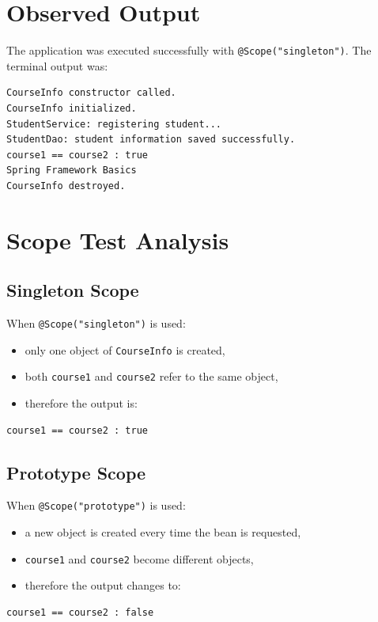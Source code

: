 \documentclass[12pt,a4paper]{article}
\begin{document}
\section{Observed Output}
The application was executed successfully with \texttt{@Scope("singleton")}. The terminal output was:

\begin{lstlisting}
CourseInfo constructor called.
CourseInfo initialized.
StudentService: registering student...
StudentDao: student information saved successfully.
course1 == course2 : true
Spring Framework Basics
CourseInfo destroyed.
\end{lstlisting}

\section{Scope Test Analysis}
\subsection{Singleton Scope}
When \texttt{@Scope("singleton")} is used:
\begin{itemize}
    \item only one object of \texttt{CourseInfo} is created,
    \item both \texttt{course1} and \texttt{course2} refer to the same object,
    \item therefore the output is:
\end{itemize}

\begin{lstlisting}
course1 == course2 : true
\end{lstlisting}

\subsection{Prototype Scope}
When \texttt{@Scope("prototype")} is used:
\begin{itemize}
    \item a new object is created every time the bean is requested,
    \item \texttt{course1} and \texttt{course2} become different objects,
    \item therefore the output changes to:
\end{itemize}

\begin{lstlisting}
course1 == course2 : false
\end{lstlisting}
\end{document}
